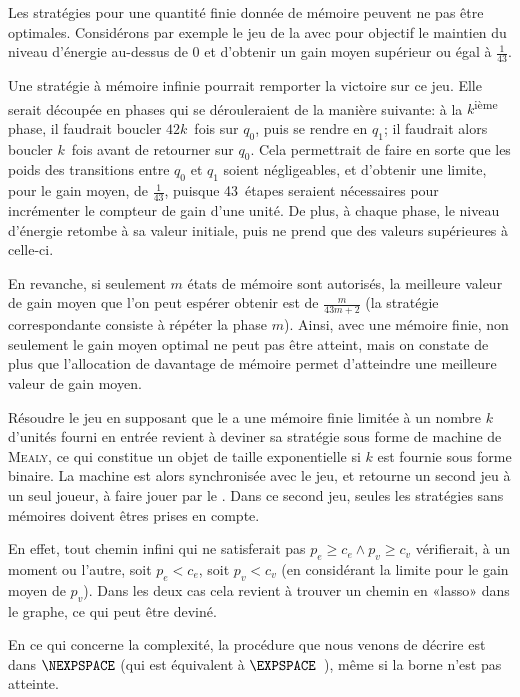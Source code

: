 \begin{remark}
Les stratégies pour une quantité finie donnée de mémoire peuvent ne pas être optimales.
Considérons par exemple le jeu de la  avec pour objectif le maintien du niveau d'énergie au-dessus de $0$ et d'obtenir un gain moyen supérieur ou égal à $\frac1{43}$.

Une stratégie à mémoire infinie pourrait remporter la victoire sur ce jeu.
Elle serait découpée en phases qui se dérouleraient de la manière suivante: à la $k$\textsuperscript{ième} phase, il faudrait boucler $42k$~fois sur $q_0$, puis se rendre en $q_1$; il faudrait alors boucler $k$~fois avant de retourner sur $q_0$.
Cela permettrait de faire en sorte que les poids des transitions entre $q_0$ et $q_1$ soient négligeables, et d'obtenir une limite, pour le gain moyen, de $\frac1{43}$, puisque 43~étapes seraient nécessaires pour incrémenter le compteur de gain d'une unité.
De plus, à chaque phase, le niveau d'énergie retombe à sa valeur initiale, puis ne prend que des valeurs supérieures à celle-ci.

En revanche, si seulement $m$ états de mémoire sont autorisés, la meilleure valeur de gain moyen que l'on peut espérer obtenir est de $\frac{m}{43m+2}$ (la stratégie correspondante consiste à répéter la phase $m$).
Ainsi, avec une mémoire finie, non seulement le gain moyen optimal ne peut pas être atteint, mais on constate de plus que l'allocation de davantage de mémoire permet d'atteindre une meilleure valeur de gain moyen.
\end{remark}

Résoudre le jeu en supposant que le \jo a une mémoire finie limitée à un nombre $k$ d'unités fourni en entrée revient à deviner sa stratégie sous forme de machine de \textsc{Mealy}, ce qui constitue un objet de taille exponentielle si $k$ est fournie sous forme binaire.
La machine est alors synchronisée avec le jeu, et retourne un second jeu à un seul joueur, à faire jouer par le \ji.
Dans ce second jeu, seules les stratégies sans mémoires doivent êtres prises en compte.

En effet, tout chemin infini qui ne satisferait pas $p_e \geq c_e \wedge p_v \geq c_v$ vérifierait, à un moment ou l'autre, soit $p_e < c_e$, soit $p_v < c_v$ (en considérant la limite pour le gain moyen de $p_v$).
Dans les deux cas cela revient à trouver un chemin en «lasso» dans le graphe, ce qui peut être deviné.

En ce qui concerne la complexité, la procédure que nous venons de décrire est dans $\NEXPSPACE$ (qui est équivalent à $\EXPSPACE$~\cite[Chap.~20]{papadimitriou94}), même si la borne n'est pas atteinte.
